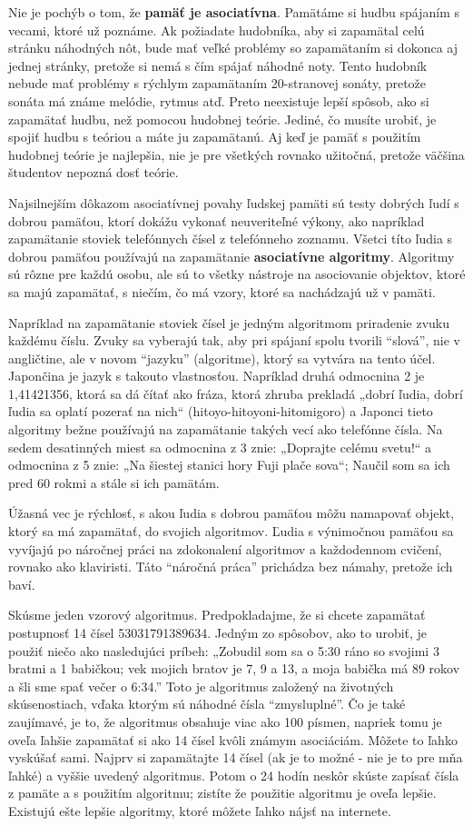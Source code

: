 \documentclass[11pt,a4paper]{book}
\begin{document}
Nie je pochýb o tom, že \textbf{pamäť je asociatívna}. Pamätáme si hudbu spájaním s vecami, ktoré už poznáme. Ak požiadate hudobníka, aby si zapamätal celú stránku náhodných  nôt, bude mať veľké problémy so zapamätaním si dokonca aj jednej stránky, pretože si nemá s čím spájať náhodné noty. Tento hudobník nebude mať problémy s rýchlym zapamätaním 20-stranovej sonáty, pretože sonáta má známe melódie, rytmus atď. Preto neexistuje lepší spôsob, ako si zapamätať hudbu, než pomocou hudobnej teórie. Jediné, čo musíte urobiť, je spojiť hudbu s teóriou a máte ju zapamätanú. Aj keď je pamäť s použitím hudobnej teórie je najlepšia, nie je pre všetkých rovnako užitočná, pretože väčšina študentov nepozná dosť teórie.

Najsilnejším dôkazom asociatívnej povahy ľudskej pamäti sú testy dobrých ľudí s dobrou pamäťou, ktorí dokážu vykonať neuveriteľné výkony, ako napríklad zapamätanie stoviek telefónnych čísel z telefónneho zoznamu. Všetci títo ľudia s dobrou pamäťou používajú na zapamätanie \textbf{asociatívne algoritmy}. Algoritmy sú rôzne pre každú osobu, ale sú to všetky nástroje na asociovanie objektov, ktoré sa majú zapamätať, s niečím, čo má vzory, ktoré sa nachádzajú už v pamäti.

Napríklad na zapamätanie stoviek čísel je jedným algoritmom priradenie zvuku každému číslu. Zvuky sa vyberajú tak, aby pri spájaní spolu tvorili “slová”, nie v angličtine, ale v novom “jazyku” (algoritme), ktorý sa vytvára na tento účel. Japončina je jazyk s takouto vlastnosťou. Napríklad druhá odmocnina 2 je 1,41421356, ktorá sa dá čítať ako fráza, ktorá zhruba prekladá „dobrí ľudia, dobrí ľudia sa oplatí pozerať na nich“ (hitoyo-hitoyoni-hitomigoro) a Japonci tieto algoritmy bežne používajú na zapamätanie takých vecí ako telefónne čísla. Na sedem desatinných miest sa odmocnina z 3 znie: „Doprajte celému svetu!“ a odmocnina z 5 znie: „Na šiestej stanici hory Fuji plače sova“; Naučil som sa ich pred 60 rokmi a stále si ich pamätám.

Úžasná vec je rýchlosť, s akou ľudia s dobrou pamäťou môžu namapovať objekt, ktorý sa má zapamätať, do svojich algoritmov. Ľudia s výnimočnou pamäťou sa vyvíjajú po náročnej práci na zdokonalení algoritmov a každodennom cvičení, rovnako ako klaviristi. Táto “náročná práca” prichádza bez námahy, pretože ich baví.

Skúsme jeden vzorový algoritmus. Predpokladajme, že si chcete zapamätať postupnosť 14 čísel 53031791389634. Jedným zo spôsobov, ako to urobiť, je použiť niečo ako nasledujúci príbeh: „Zobudil som sa o 5:30 ráno so svojimi 3 bratmi a 1 babičkou; vek mojich bratov je 7, 9 a 13, a moja babička má 89 rokov a šli sme spať večer o 6:34.” Toto je algoritmus založený na životných skúsenostiach, vďaka ktorým sú náhodné čísla “zmysluplné”. Čo je také zaujímavé, je to, že algoritmus obsahuje viac ako 100 písmen, napriek tomu je oveľa ľahšie zapamätať si ako 14 čísel kvôli známym asociáciám. Môžete to ľahko vyskúšať sami. Najprv si zapamätajte 14 čísel (ak je to možné - nie je to pre mňa ľahké) a vyššie uvedený algoritmus. Potom o 24 hodín neskôr skúste zapísať čísla z pamäte a s použitím  algoritmu; zistíte že použitie algoritmu je oveľa lepšie. Existujú ešte lepšie algoritmy, ktoré môžete ľahko nájsť na internete.
\end{document}
